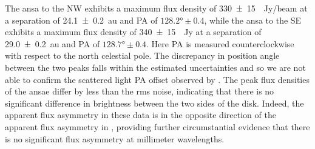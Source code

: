 \documentclass[modern]{aastex62}
\begin{document}
The ansa to the NW exhibits a maximum flux density of \SI{330 \pm 15}{\mu Jy/beam} at a separation of \SI{24.1 \pm 0.2}{au} and PA of $\ang[angle-symbol-over-decimal]{128.2} \pm 0.4$, while the ansa to the SE exhibits a maximum flux density of \SI{340 \pm 15}{\mu Jy} at a separation of \SI{29.0 \pm 0.2}{au} and PA of $\ang[angle-symbol-over-decimal]{128.7} \pm 0.4$. 
Here PA is measured counterclockwise with respect to the north celestial pole.
The discrepancy in position angle between the two peaks falls within the estimated uncertainties and so we are not able to confirm the scattered light PA offset observed by \citet{boccaletti15}. 
The peak flux densities of the ansae differ by less than the rms noise, indicating that there is no significant difference in brightness between the two sides of the disk.
Indeed, the apparent flux asymmetry in these data is in the opposite direction of the apparent flux asymmetry in \citet{macgregor13}, providing further circumstantial evidence that there is no significant flux asymmetry at millimeter wavelengths. 
\end{document}
